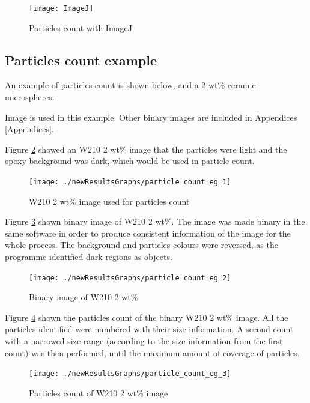 \documentclass[numbers=noendperiod,chapterprefix=on]{icldt} %
\begin{document}
\begin{figure}[!htpb]
\centering
\texttt{[image: ImageJ]}
\caption{Particles count with ImageJ} \label{ImageJ}
\end{figure}
\FloatBarrier

\subsection{Particles count example}

An example of particles count is shown below, and a 2 wt\% ceramic microspheres.  

Image is used in this example. Other binary images are included in Appendices \ref{Appendices}.

Figure \ref{particle_count_eg_1} showed an W210 2 wt\% image that the particles were light and the epoxy background was dark, which would be used in particle count.

\begin{figure}[!hp]
\centering
\texttt{[image: ./newResultsGraphs/particle\_count\_eg\_1]}
\caption{W210 2 wt\% image used for particles count} \label{particle_count_eg_1}
\end{figure}
\FloatBarrier

Figure \ref{particle_count_eg_2} shown binary image of W210 2 wt\%. The image was made binary in the same software in order to produce consistent information of the image for the whole process. The background and particles colours were reversed, as the programme identified dark regions as objects.
 
\begin{figure}[!hp]
\centering
\texttt{[image: ./newResultsGraphs/particle\_count\_eg\_2]}
\caption{Binary image of W210 2 wt\%} \label{particle_count_eg_2}
\end{figure}
\FloatBarrier

Figure \ref{particle_count_eg_3} shown the particles count of the binary W210 2 wt\% image.
All the particles identified were numbered with their size information. A second count with a narrowed size range (according to the size information from the first count) was then performed, until the maximum amount of coverage of particles.
  
\begin{figure}[!hp]
\centering
\texttt{[image: ./newResultsGraphs/particle\_count\_eg\_3]}
\caption{Particles count of W210 2 wt\% image} \label{particle_count_eg_3}
\end{figure}
\FloatBarrier
\end{document}
